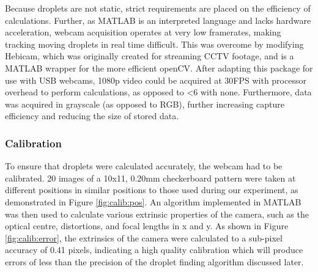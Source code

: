 \documentclass{physics_article_B}
\begin{document}
        Because droplets are not static, strict requirements are placed on the efficiency of calculations. Further, as MATLAB is an interpreted language and lacks hardware acceleration, webcam acquisition operates at very low framerates, making tracking moving droplets in real time difficult. This was overcome by modifying Hebicam\cite{HebiCam}, which was originally created for streaming CCTV footage, and is a MATLAB wrapper for the more efficient openCV. After adapting this package for use with USB webcams, 1080p video could be acquired at 30FPS with processor overhead to perform calculations, as opposed to <6 with none. Furthermore, data was acquired in grayscale (as opposed to RGB), further increasing capture efficiency and reducing the size of stored data. 
        
        \subsubsection{Calibration}
        
        To ensure that droplets were calculated accurately, the webcam had to be calibrated. 20 images of a 10x11, 0.20mm checkerboard pattern were taken at different positions in similar positions to those used during our experiment, as demonstrated in Figure \ref{fig:calib:pos}. An algorithm implemented in MATLAB\cite{CameraCalib} was then used to calculate various extrinsic properties of the camera, such as the optical centre, distortions, and focal lengths in x and y. As shown in Figure \ref{fig:calib:error}, the extrinsics of the camera were calculated to a sub-pixel accuracy of 0.41 pixels, indicating a high quality calibration which will produce errors of less than the precision of the droplet finding algorithm discussed later. \\
        
\end{document}
